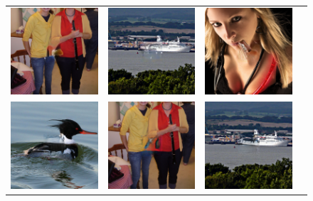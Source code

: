 \begin{figure}[H]
\begin{tabular}{cccc}
  \includegraphics[width=.24\textwidth]{figures/imagenet/imagenet_0034_siggraph2017.png}&
  \includegraphics[width=.24\textwidth]{figures/imagenet/imagenet_0165_siggraph2017.png}&
  \includegraphics[width=.24\textwidth]{figures/imagenet/imagenet_0197_siggraph2017.png}\\
  \includegraphics[width=.24\textwidth]{figures/imagenet/imagenet_0011_g.png}&
  \includegraphics[width=.24\textwidth]{figures/imagenet/imagenet_0034_g.png}&
  \includegraphics[width=.24\textwidth]{figures/imagenet/imagenet_0165_g.png}&

\end{tabular}
\end{figure}
